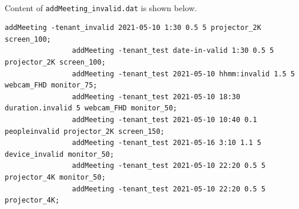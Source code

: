 \documentclass{article}
\begin{document}
            \paragraph{}
                Content of \texttt{addMeeting\_invalid.dat} is shown below.
            \begin{Verbatim}[gobble=8]
                addMeeting -tenant_invalid 2021-05-10 1:30 0.5 5 projector_2K screen_100;
                addMeeting -tenant_test date-in-valid 1:30 0.5 5 projector_2K screen_100;
                addMeeting -tenant_test 2021-05-10 hhmm:invalid 1.5 5 webcam_FHD monitor_75;
                addMeeting -tenant_test 2021-05-10 18:30 duration.invalid 5 webcam_FHD monitor_50;
                addMeeting -tenant_test 2021-05-10 10:40 0.1 peopleinvalid projector_2K screen_150;
                addMeeting -tenant_test 2021-05-16 3:10 1.1 5 device_invalid monitor_50;
                addMeeting -tenant_test 2021-05-10 22:20 0.5 5 projector_4K monitor_50;
                addMeeting -tenant_test 2021-05-10 22:20 0.5 5 projector_4K;
            \end{Verbatim}
\end{document}

